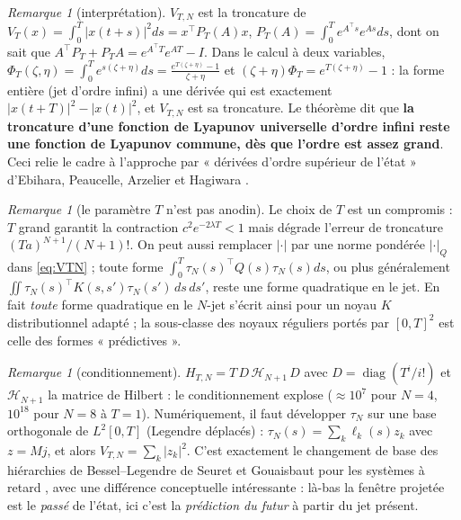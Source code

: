 \documentclass[11pt,a4paper]{article}
\theoremstyle{definition}
\theoremstyle{remark}
\newtheorem{remark}[theorem]{Remarque}
\newcommand{\tr}{^{\top}}
\begin{document}
\begin{remark}[interprétation]
$V_{T,N}$ est la troncature de $V_T(x) = \int_0^T|x(t+s)|^2ds = x\tr P_T(A)x$, $P_T(A) = \int_0^Te^{A\tr s}e^{As}ds$, dont on sait que $A\tr P_T + P_TA = e^{A\tr T}e^{AT}-I$. Dans le calcul à deux variables, $\Phi_T(\zeta,\eta) = \int_0^Te^{s(\zeta+\eta)}ds = \frac{e^{T(\zeta+\eta)}-1}{\zeta+\eta}$ et $(\zeta+\eta)\Phi_T = e^{T(\zeta+\eta)}-1$ : la forme entière (jet d'ordre infini) a une dérivée qui est exactement $|x(t+T)|^2-|x(t)|^2$, et $V_{T,N}$ est sa troncature. Le théorème dit que \textbf{la troncature d'une fonction de Lyapunov universelle d'ordre infini reste une fonction de Lyapunov commune, dès que l'ordre est assez grand}. Ceci relie le cadre à l'approche par « dérivées d'ordre supérieur de l'état » d'Ebihara, Peaucelle, Arzelier et Hagiwara \cite{EPAH}.
\end{remark}

\begin{remark}[le paramètre $T$ n'est pas anodin]
Le choix de $T$ est un compromis : $T$ grand garantit la contraction $c^2e^{-2\lambda T}<1$ mais dégrade l'erreur de troncature $(Ta)^{N+1}/(N+1)!$. On peut aussi remplacer $|\cdot|$ par une norme pondérée $|\cdot|_Q$ dans \eqref{eq:VTN} ; toute forme $\int_0^T\tau_N(s)\tr Q(s)\tau_N(s)ds$, ou plus généralement $\iint\tau_N(s)\tr K(s,s')\tau_N(s')\,ds\,ds'$, reste une forme quadratique en le jet. En fait \emph{toute} forme quadratique en le $N$-jet s'écrit ainsi pour un noyau $K$ distributionnel adapté ; la sous-classe des noyaux réguliers portés par $[0,T]^2$ est celle des formes « prédictives ».
\end{remark}

\begin{remark}[conditionnement]
$H_{T,N} = T\,D\,\mathcal H_{N+1}\,D$ avec $D=\operatorname{diag}(T^i/i!)$ et $\mathcal H_{N+1}$ la matrice de Hilbert : le conditionnement explose ($\approx 10^{7}$ pour $N=4$, $10^{18}$ pour $N=8$ à $T=1$). Numériquement, il faut développer $\tau_N$ sur une base orthogonale de $L^2[0,T]$ (Legendre déplacés) : $\tau_N(s) = \sum_k\ell_k(s)z_k$ avec $z = Mj$, et alors $V_{T,N} = \sum_k|z_k|^2$. C'est exactement le changement de base des hiérarchies de Bessel–Legendre de Seuret et Gouaisbaut pour les systèmes à retard \cite{SG,BSG}, avec une différence conceptuelle intéressante : là-bas la fenêtre projetée est le \emph{passé} de l'état, ici c'est la \emph{prédiction du futur} à partir du jet présent.
\end{remark}
\end{document}
